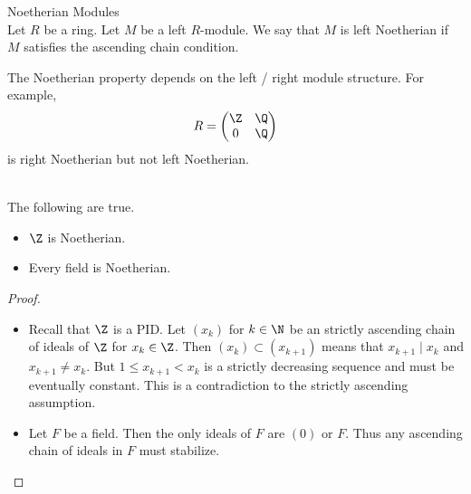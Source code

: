 \documentclass[a4paper]{article}
\begin{document}
\begin{defn}{Noetherian Modules}{}\\
Let $R$ be a ring. Let $M$ be a left $R$-module. We say that $M$ is left Noetherian if $M$ satisfies the ascending chain condition. 
\end{defn}

The Noetherian property depends on the left / right module structure. For example, $$R=\begin{pmatrix}
\Z & \Q\\
0 & \Q
\end{pmatrix}$$ is right Noetherian but not left Noetherian. 

\begin{eg}{}{}\\
The following are true. 
\begin{itemize}
\item $\Z$ is Noetherian. 
\item Every field is Noetherian. 
\end{itemize}
\begin{proof}\\
\begin{itemize}
\item Recall that $\Z$ is a PID. Let $(x_k)$ for $k\in\N$ be an strictly ascending chain of ideals of $\Z$ for $x_k\in\Z$. Then $(x_k)\subset(x_{k+1})$ means that $x_{k+1}\;|\;x_k$ and $x_{k+1}\neq x_k$. But $1\leq x_{k+1}<x_k$ is a strictly decreasing sequence and must be eventually constant. This is a contradiction to the strictly ascending assumption. 
\item Let $F$ be a field. Then the only ideals of $F$ are $(0)$ or $F$. Thus any ascending chain of ideals in $F$ must stabilize. 
\end{itemize}
\end{proof}
\end{eg}
\end{document}
